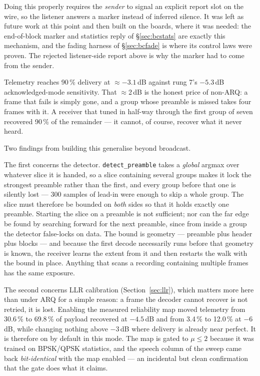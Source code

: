 Doing this properly requires the \emph{sender} to signal an explicit
report slot on the wire, so the listener answers a marker instead of
inferred silence.  It was left as future work at this point and then
built on the boards, where it was needed: the end-of-block marker and
statistics reply of \S\ref{sec:bcstats} are exactly this mechanism,
and the fading harness of \S\ref{sec:bcfade} is where its control laws
were proven.  The rejected listener-side report above is why the
marker had to come from the sender.

Telemetry reaches 90\,\% delivery at $\approx-3.1$\,dB against rung 7's
$-5.3$\,dB acknowledged-mode sensitivity.  That $\approx$2\,dB is the
honest price of non-ARQ: a frame that fails is simply gone, and a group
whose preamble is missed takes four frames with it.  A receiver that
tuned in half-way through the first group of seven recovered 90\,\% of
the remainder --- it cannot, of course, recover what it never heard.

Two findings from building this generalise beyond broadcast.

The first concerns the detector.  \texttt{detect\_preamble} takes a
\emph{global} argmax over whatever slice it is handed, so a slice
containing several groups makes it lock the strongest preamble rather
than the first, and every group before that one is silently lost --- 300
samples of lead-in were enough to skip a whole group.  The slice must
therefore be bounded on \emph{both} sides so that it holds exactly one
preamble.  Starting the slice on a preamble is not sufficient; nor can
the far edge be found by searching forward for the next preamble, since
from inside a group the detector false-locks on data.  The bound is
geometry --- preamble plus header plus blocks --- and because the first
decode necessarily runs before that geometry is known, the receiver
learns the extent from it and then restarts the walk with the bound in
place.  Anything that scans a recording containing multiple frames has
the same exposure.

The second concerns LLR calibration (Section~\ref{sec:llr}), which
matters more here than under ARQ for a simple reason: a frame the
decoder cannot recover is not retried, it is lost.  Enabling the
measured reliability map moved telemetry from 30.6\,\% to 69.8\,\% of
payload recovered at $-4.5$\,dB and from 3.4\,\% to 12.0\,\% at
$-6$\,dB, while changing nothing above $-3$\,dB where delivery is
already near perfect.  It is therefore on by default in this mode.  The
map is gated to $\mu \le 2$ because it was trained on BPSK/QPSK
statistics, and the speech column of the sweep came back
\emph{bit-identical} with the map enabled --- an incidental but clean
confirmation that the gate does what it claims.

